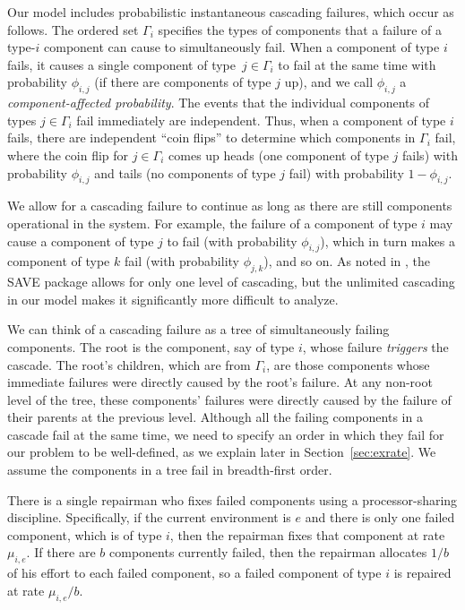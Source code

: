 \documentclass[12pt]{article}
\begin{document}
Our model includes probabilistic instantaneous cascading failures, which occur as follows. The ordered set $\Gamma_i$ specifies the types of components that a failure of a type-$i$ component can cause to simultaneously fail. When a component of type $i$ fails, it causes a single  component of type~$j \in \Gamma_i$ to fail at the same time with probability $\phi_{i, j}$ (if there are components of type $j$ up), and we call $\phi_{i, j}$  a \textit{component-affected probability}. The events that the individual components of types $j \in \Gamma_i$ fail immediately are independent. Thus, when a component of type $i$ fails, there are independent ``coin flips'' to determine which components in $\Gamma_i$ fail, where the coin flip for $j \in \Gamma_i$ comes up heads (one component of type $j$ fails) with probability $\phi_{i, j}$ and tails (no components of type $j$ fail) with probability $1 - \phi_{i, j}$.

We allow for a cascading failure to continue as long as there are still components operational in the system.  For example, the failure of a component of type $i$ may cause a component of type $j$ to fail (with probability $\phi_{i, j}$), which in turn makes a component of type $k$ fail (with probability $\phi_{j, k}$), and so on. As noted in \cite{ING:2009}, the SAVE package \cite{BHLNS:1994} allows for only one level of cascading, but the unlimited cascading in our model makes it significantly more difficult to analyze.

We can think of a cascading failure as a tree of simultaneously failing components. The root is the component, say of type $i$, whose failure \textit{triggers} the cascade. The root's children, which are from $\Gamma_i$, are those components whose immediate failures were directly caused by the root's failure. At any non-root level of the tree,  these components' failures were directly caused by the failure of their parents at the previous level. Although all the failing components in a cascade fail at the same time, we need to specify an order in which they fail for our problem to be well-defined, as we explain later in Section~\ref{sec:exrate}. We assume the components in a tree fail in breadth-first order.

There is a single repairman who fixes failed components using a processor-sharing discipline. Specifically, if the current environment is $e$ and there is only one failed component, which is of type $i$, then the repairman fixes that component at rate $\mu_{i, e}$. If there are $b$ components currently failed, then the repairman allocates $1 / b$ of his effort to each failed component, so a failed component of type $i$ is repaired at rate $\mu_{i, e}/b$.
\end{document}
